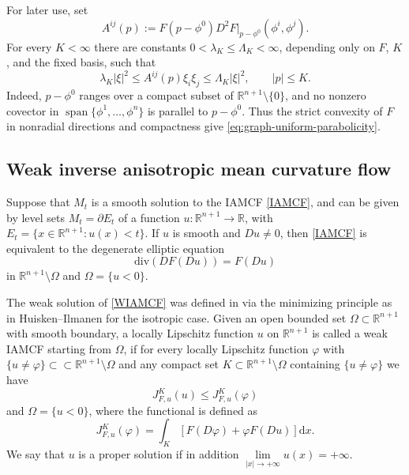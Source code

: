 \documentclass[11pt,reqno]{amsart}
\theoremstyle{definition}
\theoremstyle{remark}
\numberwithin{equation}{section}
\begin{document}
	For later use, set
	\begin{equation}
	\label{eq:graph-coefficients}
	 A^{ij}(p):=F(p-\phi^0)D^2F|_{p-\phi^0}(\phi^i,\phi^j).
	\end{equation}
	For every $K<\infty$ there are constants $0<\lambda_K\leq\Lambda_K<\infty$, depending only on $F$, $K$, and the fixed basis, such that
	\begin{equation}
	\label{eq:graph-uniform-parabolicity}
	 \lambda_K|\xi|^2\leq A^{ij}(p)\xi_i\xi_j
	 \leq\Lambda_K|\xi|^2,
	 \qquad |p|\leq K.
	\end{equation}
	Indeed, $p-\phi^0$ ranges over a compact subset of $\mathbb R^{n+1}\setminus\{0\}$, and no nonzero covector in $\operatorname{span}\{\phi^1,\ldots,\phi^n\}$ is parallel to $p-\phi^0$. Thus the strict convexity of $F$ in nonradial directions and compactness give \eqref{eq:graph-uniform-parabolicity}.
	
	\subsection{Weak inverse anisotropic mean curvature flow} \label{sec.2-wiamcf}

Suppose that $M_t$ is a smooth solution to the IAMCF \eqref{IAMCF}, and can be given by level sets $M_t=\partial E_t$ of a function $u:\mathbb{R}^{n+1} \to \mathbb{R}$, with $E_t=\{x\in\mathbb{R}^{n+1}:u(x)<t\}$. If $u$ is smooth and $Du\neq 0$, then \eqref{IAMCF} is equivalent to the degenerate elliptic equation 
\begin{equation}\label{WIAMCF}
    \text{div}(DF(Du))=F(Du)
\end{equation}
in $\mathbb{R}^{n+1}\setminus \Omega$ and $\Omega=\{u<0\}$. 


The weak solution of \eqref{WIAMCF} was defined in \cite{DGX23} via the minimizing principle as in Huisken--Ilmanen \cite{HI01} for the isotropic case.  
Given an open bounded set $\Omega\subset \mathbb{R}^{n+1}$ with smooth boundary, a locally Lipschitz function $u$ on $\mathbb{R}^{n+1}$ is called a weak IAMCF starting from $\Omega$, if for every locally Lipschitz function $\varphi$  with $\{u\neq\varphi\}\subset\subset \mathbb{R}^{n+1}\setminus\Omega$ and any compact set $K\subset \mathbb{R}^{n+1}\setminus\Omega$ containing $\{u\neq\varphi\}$ we have 
  \begin{equation*}
        J_{F,u}^K(u) \leq J_{F,u}^K(\varphi)
    \end{equation*}
and $\Omega=\{u<0\}$, where the functional is defined as 
 \begin{equation*}
        J_{F,u}^K(\varphi) = \int_{K} \left[ F(D\varphi)+\varphi F(Du) \right] \mathrm{d}x.
\end{equation*}
 We say that $u$ is a proper solution if in addition $\lim\limits_{|x|\to+\infty}u(x)=+\infty$.
\end{document}
